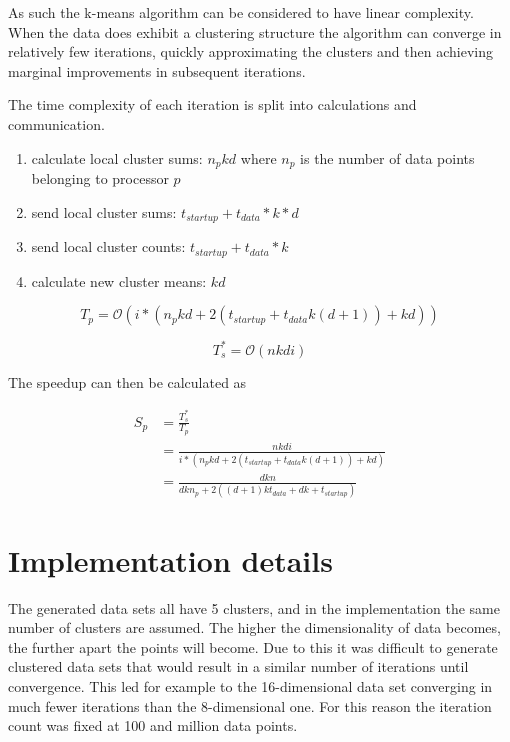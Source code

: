 \documentclass[parskip=true]{scrartcl}
\begin{document}
As such the k-means algorithm can be considered to have linear complexity. When the data does exhibit a clustering structure the algorithm can converge in relatively few iterations, quickly approximating the clusters and then achieving marginal improvements in subsequent iterations. 

The time complexity of each iteration is split into calculations and communication. 
\begin{enumerate}
    \item calculate local cluster sums: $n_{p}kd$ where $n_p$ is the number of data points belonging to processor $p$
    \item send local cluster sums: $t_{startup} + t_{data} * k * d$
    \item send local cluster counts: $t_{startup} + t_{data} * k$
    \item calculate new cluster means: $kd$ 
\end{enumerate} 

\begin{equation}
T_p = \mathcal{O}(i * (n_{p}kd + 2(t_{startup} + t_{data}k(d + 1)) + kd))
\end{equation}

\begin{equation}
T^*_s = \mathcal{O}(nkdi)
\end{equation}

The speedup can then be calculated as

\begin{equation}
\begin{split}
    S_p &= \frac{T^*_s}{T_p} \\
        &= \frac{nkdi}{i * (n_{p}kd + 2(t_{startup} + t_{data}k(d + 1)) + kd)} \\
        &= \frac{dkn}{dkn_p + 2((d+1)kt_{data} + dk + t_{startup})}
\end{split}
\end{equation}


\section{Implementation details}
The generated data sets all have 5 clusters, and in the implementation the same number of clusters are assumed. The higher the dimensionality of data becomes, the further apart the points will become. Due to this it was difficult to generate clustered data sets that would result in a similar number of iterations until convergence. This led for example to the 16-dimensional data set converging in much fewer iterations than the 8-dimensional one. For this reason the iteration count was fixed at 100 and million data points.
\end{document}
